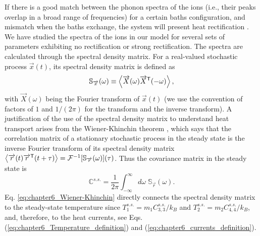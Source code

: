 If there is a good match between the phonon spectra of the ions (i.e., their peaks overlap in a broad range of frequencies) for a certain baths configuration, and mismatch when the baths exchange, the system will present heat rectification \cite{Terraneo2002,Li2004}.
We have studied the spectra of the ions in our model for several sets of parameters exhibiting no rectification or strong rectification. The spectra are calculated  through the spectral density matrix. For a real-valued stochastic process $\overrightarrow{x}(t)$, its spectral density matrix is defined as \cite{Sarkka2019}
%
\begin{equation}
  \mathbb{S}_{\overrightarrow{x}}(\omega) \equiv \expval{ \overrightarrow{X}(\omega) \overrightarrow{X}^\mathsf{T}(-\omega) },
  \label{eq:chapter6_SpectralDensityDefinition}
\end{equation}
%
with $\overrightarrow{X}(\omega)$ being the Fourier transform of $\overrightarrow{x}(t)$ (we use the convention of factors of $1$ and ${1}/{(2\pi)}$ for the transform and the inverse transform). A justification of the use of the spectral density matrix to understand heat transport arises from the Wiener-Khinchin theorem \cite{Sarkka2019}, which says that the correlation matrix of a stationary stochastic process in the steady state is the inverse Fourier transform of its spectral density matrix $\expval{\overrightarrow{r}(t)\overrightarrow{r}^\mathsf{T}(t+\tau)} = \mathcal{F}^{-1}[\mathbb{S}_{\overrightarrow{r}}(\omega)](\tau)$. Thus  the covariance matrix in the steady state is
%
\begin{equation}
  \mathbb{C}^{s.s.} = \frac{1}{2\pi} \int_{-\infty}^{\infty}d\omega\;\mathbb{S}_{\overrightarrow{r}}(\omega).
  \label{eq:chapter6_Wiener-Khinchin}
\end{equation}
%
Eq. \eqref{eq:chapter6_Wiener-Khinchin} directly connects the spectral density matrix to the steady-state temperature
since  $T_1^{s.s.} = {m_1 C_{3,3}^{s.s.}}/{k_B}$ and $T_2^{s.s.} = {m_2 C_{4,4}^{s.s.}}/{k_B}$, and, therefore, to the heat currents,
see  Eqs.(\ref{eq:chapter6_Temperature_definition}) and (\ref{eq:chapter6_currents_definition}).



